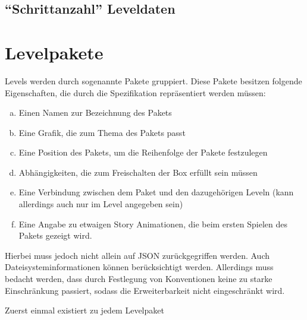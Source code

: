 \subsection{"`Schrittanzahl"' Leveldaten}

\section{Levelpakete}
Levels werden durch sogenannte Pakete gruppiert.
Diese Pakete besitzen folgende Eigenschaften, die durch die Spezifikation repräsentiert werden müssen:
\begin{enumerate}[a)]
	\item Einen Namen zur Bezeichnung des Pakets
	\item Eine Grafik, die zum Thema des Pakets passt
	\item Eine Position des Pakets, um die Reihenfolge der Pakete festzulegen
	\item Abhängigkeiten, die zum Freischalten der Box erfüllt sein müssen
	\item Eine Verbindung zwischen dem Paket und den dazugehörigen Leveln (kann allerdings auch nur im Level angegeben sein)
	\item Eine Angabe zu etwaigen Story Animationen, die beim ersten Spielen des Pakets gezeigt wird.
\end{enumerate}
Hierbei muss jedoch nicht allein auf JSON zurückgegriffen werden.
Auch Dateisysteminformationen können berücksichtigt werden.
Allerdings muss bedacht werden, dass durch Festlegung von Konventionen keine zu starke Einschränkung passiert, sodass die Erweiterbarkeit nicht eingeschränkt wird.

Zuerst einmal existiert zu jedem Levelpaket 
